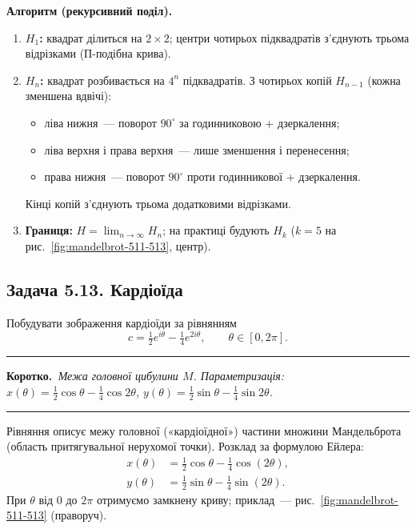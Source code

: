 \documentclass[12pt,a4paper]{article}
\newenvironment{korotko}
  {\par\medskip\noindent\begingroup\color{accent!75!black}\rule{\linewidth}{0.4pt}\par
   \noindent\textbf{Коротко.}\itshape\,}
  {\par\noindent\rule{\linewidth}{0.4pt}\endgroup\medskip}
\begin{document}
\textbf{Алгоритм (рекурсивний поділ).}
\begin{enumerate}[leftmargin=1.6em,itemsep=0.25em]
  \item \textbf{$H_1$:} квадрат ділиться на $2\times2$; центри чотирьох підквадратів
        з'єднують трьома відрізками (П-подібна крива).
  \item \textbf{$H_n$:} квадрат розбивається на $4^n$ підквадратів. З чотирьох копій
        $H_{n-1}$ (кожна зменшена вдвічі):
        \begin{itemize}[leftmargin=1.2em,itemsep=0.15em]
          \item ліва нижня~--- поворот $90^\circ$ за годинниковою + дзеркалення;
          \item ліва верхня і права верхня~--- лише зменшення і перенесення;
          \item права нижня~--- поворот $90^\circ$ проти годинникової + дзеркалення.
        \end{itemize}
        Кінці копій з'єднують трьома додатковими відрізками.
  \item \textbf{Границя:} $H=\lim_{n\to\infty}H_n$; на практиці будують $H_k$
        ($k=5$ на рис.~\ref{fig:mandelbrot-511-513}, центр).
\end{enumerate}

\subsection{Задача 5.13. Кардіоїда}
Побудувати зображення кардіоїди за рівнянням
\begin{equation*}
  c=\tfrac12 e^{i\theta}-\tfrac14 e^{2i\theta},\qquad \theta\in[0,2\pi].
\end{equation*}

\begin{korotko}
Межа головної цибулини $M$. Параметризація: $x(\theta)=\tfrac12\cos\theta-\tfrac14\cos2\theta$,
$y(\theta)=\tfrac12\sin\theta-\tfrac14\sin2\theta$.
\end{korotko}

Рівняння описує межу головної («кардіоїдної») частини множини Мандельброта
(область притягувальної нерухомої точки). Розклад за формулою Ейлера:
\begin{align*}
  x(\theta) &= \tfrac12\cos\theta-\tfrac14\cos(2\theta),\\
  y(\theta) &= \tfrac12\sin\theta-\tfrac14\sin(2\theta).
\end{align*}
При $\theta$ від $0$ до $2\pi$ отримуємо замкнену криву; приклад~---
рис.~\ref{fig:mandelbrot-511-513} (праворуч).
\end{document}
